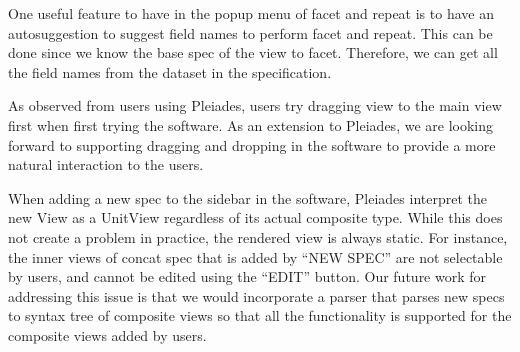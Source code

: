 \documentclass[journal]{vgtc}                %
\begin{document}
One useful feature to have in the popup menu of facet and repeat is to have an autosuggestion
to suggest field names to perform facet and repeat. This can be done since we know the
base spec of the view to facet. Therefore, we can get all the field names from the dataset
in the specification.

As observed from users using Pleiades, users try dragging view to the main view
first when first trying the software. As an extension to Pleiades, we are looking
forward to supporting dragging and dropping in the software to provide a more natural
interaction to the users.

When adding a new spec to the sidebar in the software, Pleiades interpret the new
View as a UnitView regardless of its actual composite type. While this does not
create a problem in practice, the rendered view is always static. For instance,
the inner views of concat spec that is added by “NEW SPEC” are not selectable by
users, and cannot be edited using the “EDIT” button.  Our future work for addressing
this issue is that we would incorporate a parser that parses new specs to syntax tree
of composite views so that all the functionality is supported for the composite
views added by users.




\end{document}
